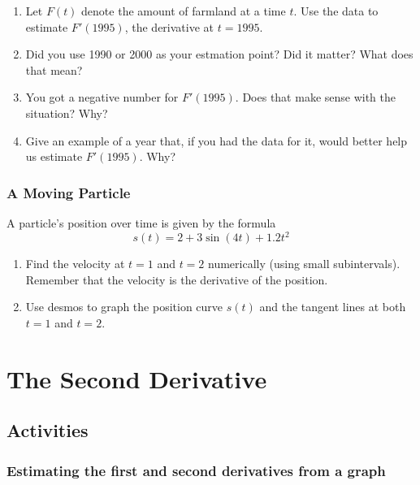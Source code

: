 \documentclass[
]{book}
\providecommand{\tightlist}{%
  \setlength{\itemsep}{0pt}\setlength{\parskip}{0pt}}
\begin{document}
\begin{enumerate}
\def\labelenumi{\arabic{enumi}.}
\tightlist
\item
  Let \(F(t)\) denote the amount of farmland at a time \(t\). Use the data to estimate \(F'(1995)\), the derivative at \(t=1995\).
\item
  Did you use 1990 or 2000 as your estmation point? Did it matter? What does that mean?
\item
  You got a negative number for \(F'(1995)\). Does that make sense with the situation? Why?
\item
  Give an example of a year that, if you had the data for it, would better help us estimate \(F'(1995)\). Why?
\end{enumerate}

\hypertarget{a-moving-particle}{%
\subsection{A Moving Particle}\label{a-moving-particle}}

A particle's position over time is given by the formula
\[
s(t)=2+3\sin(4t)+1.2t^2
\]

\begin{enumerate}
\def\labelenumi{\arabic{enumi}.}
\tightlist
\item
  Find the velocity at \(t=1\) and \(t=2\) numerically (using small subintervals). Remember that the velocity is the derivative of the position.
\item
  Use desmos to graph the position curve \(s(t)\) and the tangent lines at both \(t=1\) and \(t=2\).
\end{enumerate}

\hypertarget{the-second-derivative}{%
\chapter{The Second Derivative}\label{the-second-derivative}}

\hypertarget{activities-11}{%
\section{Activities}\label{activities-11}}

\hypertarget{estimating-the-first-and-second-derivatives-from-a-graph}{%
\subsection{Estimating the first and second derivatives from a graph}\label{estimating-the-first-and-second-derivatives-from-a-graph}}
\end{document}

